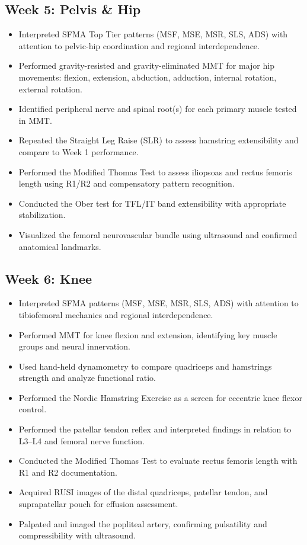 \subsection*{Week 5: Pelvis \& Hip}
\begin{itemize}
  \item [$\square$] Interpreted SFMA Top Tier patterns (MSF, MSE, MSR, SLS, ADS) with attention to pelvic-hip coordination and regional interdependence.
  \item [$\square$] Performed gravity-resisted and gravity-eliminated MMT for major hip movements: flexion, extension, abduction, adduction, internal rotation, external rotation.
  \item [$\square$] Identified peripheral nerve and spinal root(s) for each primary muscle tested in MMT.
  \item [$\square$] Repeated the Straight Leg Raise (SLR) to assess hamstring extensibility and compare to Week 1 performance.
  \item [$\square$] Performed the Modified Thomas Test to assess iliopsoas and rectus femoris length using R1/R2 and compensatory pattern recognition.
  \item [$\square$] Conducted the Ober test for TFL/IT band extensibility with appropriate stabilization.
  \item [$\square$] Visualized the femoral neurovascular bundle using ultrasound and confirmed anatomical landmarks.
\end{itemize}


\subsection*{Week 6: Knee}

\begin{itemize}
  \item [$\square$] Interpreted SFMA patterns (MSF, MSE, MSR, SLS, ADS) with attention to tibiofemoral mechanics and regional interdependence.
  \item [$\square$] Performed MMT for knee flexion and extension, identifying key muscle groups and neural innervation.
  \item [$\square$] Used hand-held dynamometry to compare quadriceps and hamstrings strength and analyze functional ratio.
  \item [$\square$] Performed the Nordic Hamstring Exercise as a screen for eccentric knee flexor control.
  \item [$\square$] Performed the patellar tendon reflex and interpreted findings in relation to L3–L4 and femoral nerve function.
  \item [$\square$] Conducted the Modified Thomas Test to evaluate rectus femoris length with R1 and R2 documentation.
  \item [$\square$] Acquired RUSI images of the distal quadriceps, patellar tendon, and suprapatellar pouch for effusion assessment.
  \item [$\square$] Palpated and imaged the popliteal artery, confirming pulsatility and compressibility with ultrasound.
\end{itemize}

